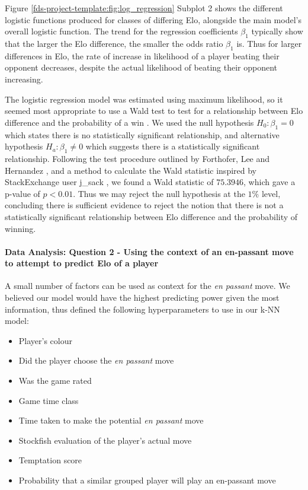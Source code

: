 \documentclass[10pt,a4paper]{article}
\begin{document}
\begin{multicols}{2}
Figure \ref{fds-project-template:fig:log_regression} Subplot 2 shows the different logistic functions produced for classes of differing Elo, alongside the main model's overall logistic function. The trend for the regression coefficients $\beta_{1}$ typically show that the larger the Elo difference, the smaller the odds ratio $\beta_{1}$ is. Thus for larger differences in Elo, the rate of increase in likelihood of a player beating their opponent decreases, despite the actual likelihood of beating their opponent increasing. \newline

The logistic regression model was estimated using maximum likelihood, so it seemed most appropriate to use a Wald test to test for a relationship between Elo difference and the probability of a win \cite{WaldTest}. We used the null hypothesis $H_{0}: \beta_{1} = 0$ which states there is no statistically significant relationship, and alternative hypothesis $H_{a}: \beta_{1} \neq 0$ which suggests there is a statistically significant relationship. Following the test procedure outlined by Forthofer, Lee and Hernandez \cite{WaldTest}, and a method to calculate the Wald statistic inspired by StackExchange user j\_sack \cite{StackExchangeWaldTest}, we found a Wald statistic of $75.3946$, which gave a p-value of $p<0.01$. Thus we may reject the null hypothesis at the $1\%$ level, concluding there is sufficient evidence to reject the notion that there is not a statistically significant relationship between Elo difference and the probability of winning. \newline

\paragraph{Data Analysis: Question 2 - Using the context of an en-passant move to attempt to predict Elo of a player}

A small number of factors can be used as context for the \textit{en passant} move. We believed our model would have the highest predicting power given the most information, thus defined the following hyperparameters to use in our k-NN model:

\begin{itemize}
\addtolength\itemsep{-2.5mm}
  \item Player's colour
  \item Did the player choose the \textit{en passant} move
  \item Was the game rated
  \item Game time class
  \item Time taken to make the potential \textit{en passant} move
  \item Stockfish evaluation of the player's actual move
  \item Temptation score
  \item Probability that a similar grouped player will play an en-passant move
\end{itemize}


\end{multicols}
\end{document}
